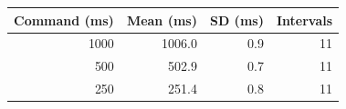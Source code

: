 \begin{tabular}{@{}rrrr@{}}
\toprule
Command (ms) & Mean (ms) & SD (ms) & Intervals \\
\midrule
1000 & 1006.0 & 0.9 & 11 \\
500 & 502.9 & 0.7 & 11 \\
250 & 251.4 & 0.8 & 11 \\
\bottomrule
\end{tabular}
